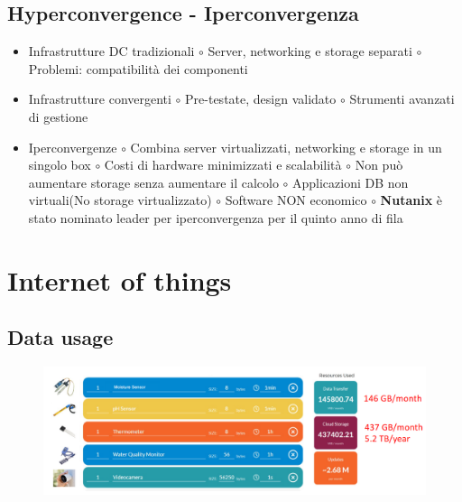 \documentclass[a4paper, 12pt]{report}
\begin{document}
          \section{Hyperconvergence - Iperconvergenza}
          \begin{itemize}
            \item Infrastrutture DC tradizionali 
            \subitem $\circ$ Server, networking e storage separati 
            \subitem $\circ$ Problemi: compatibilità dei componenti
            \item Infrastrutture convergenti
            \subitem $\circ$ Pre-testate, design validato
            \subitem $\circ$ Strumenti avanzati di gestione
            \item Iperconvergenze 
            \subitem $\circ$ Combina server virtualizzati, networking e storage in un singolo box
            \subitem $\circ$ Costi di hardware minimizzati e scalabilità
            \subitem $\circ$ Non può aumentare storage senza aumentare il calcolo
            \subitem $\circ$ Applicazioni DB non virtuali(No storage virtualizzato)
            \subitem $\circ$ Software NON economico
            \subitem $\circ$ \textbf{Nutanix} è stato nominato leader per iperconvergenza per il quinto anno di fila
          \end{itemize}
        \chapter{Internet of things}
        \section{Data usage}
        \begin{figure}[htbp]
          \centering
          \includegraphics[scale=0.3]{Immagini/DataUsage.png}
        \end{figure}
\end{document}
